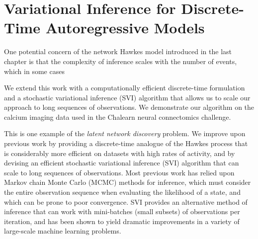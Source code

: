\chapter{Variational Inference for Discrete-Time Autoregressive Models}


One potential concern  of the network Hawkes model introduced 
in the last chapter is that the complexity of inference scales with the 
number of events, which in some cases 
 
We extend this work with a
computationally efficient discrete-time formulation and a stochastic
variational inference (SVI) algorithm that allows us to scale our
approach to long sequences of observations.  We demonstrate our
algorithm on the calcium imaging data used in the Chalearn neural
connectomics challenge.


This is one example of the \emph{latent network discovery} problem.
We improve upon previous work by providing a discrete-time analogue of
the Hawkes process that is considerably more efficient on datasets
with high rates of activity, and by devising an efficient stochastic
variational inference (SVI) algorithm that can scale to long sequences
of observations.  Most previous work has relied upon Markov chain
Monte Carlo (MCMC) methods for inference, which must consider the
entire observation sequence when evaluating the likelihood of a state,
and which can be prone to poor convergence.  SVI provides an
alternative method of inference that can work with mini-batches (small
subsets) of observations per iteration, and has been shown to yield
dramatic improvements in a variety of large-scale machine learning
problems.

